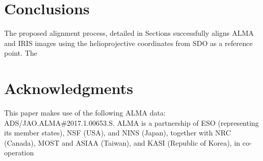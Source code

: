 \documentclass[a4paper,alpha-refs]{eSpectra}
\begin{document}
\section{Conclusions}
The proposed alignment process, detailed in   Sections
successfully aligns ALMA and IRIS images using the helioprojective coordinates from SDO as a reference point. The 


\section*{Acknowledgments}
This paper makes use of the following ALMA data: ADS/JAO.ALMA\#2017.1.00653.S. ALMA is a partnership of ESO (representing its member states), NSF (USA), and NINS (Japan), together with NRC (Canada), MOST and ASIAA (Taiwan), and KASI (Republic of Korea), in co-operation 





\end{document}
